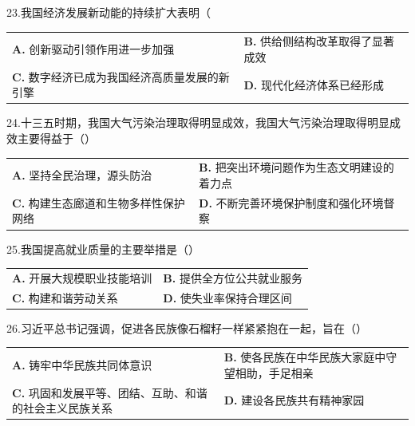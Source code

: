 \documentclass[UTF8,11pt]{ctexart}
\begin{document}
23.我国经济发展新动能的持续扩大表明（


\begin{center}\begin{tabular}{>{\raggedright\arraybackslash}p{\dimexpr(\linewidth-4\tabcolsep)/2\relax}>{\raggedright\arraybackslash}p{\dimexpr(\linewidth-4\tabcolsep)/2\relax}}
\textbf{A.} 创新驱动引领作用进一步加强 & \textbf{B.} 供给侧结构改革取得了显著成效\\[.35em]
\textbf{C.} 数字经济已成为我国经济高质量发展的新引擎 & \textbf{D.} 现代化经济体系已经形成\\[.35em]\end{tabular}\end{center}

24.十三五时期，我国大气污染治理取得明显成效，我国大气污染治理取得明显成效主要得益于（）


\begin{center}\begin{tabular}{>{\raggedright\arraybackslash}p{\dimexpr(\linewidth-4\tabcolsep)/2\relax}>{\raggedright\arraybackslash}p{\dimexpr(\linewidth-4\tabcolsep)/2\relax}}
\textbf{A.} 坚持全民治理，源头防治 & \textbf{B.} 把突出环境问题作为生态文明建设的着力点\\[.35em]
\textbf{C.} 构建生态廊道和生物多样性保护网络 & \textbf{D.} 不断完善环境保护制度和强化环境督察\\[.35em]\end{tabular}\end{center}

25.我国提高就业质量的主要举措是（）


\begin{center}\begin{tabular}{>{\raggedright\arraybackslash}p{\dimexpr(\linewidth-4\tabcolsep)/2\relax}>{\raggedright\arraybackslash}p{\dimexpr(\linewidth-4\tabcolsep)/2\relax}}
\textbf{A.} 开展大规模职业技能培训 & \textbf{B.} 提供全方位公共就业服务\\[.35em]
\textbf{C.} 构建和谐劳动关系 & \textbf{D.} 使失业率保持合理区间\\[.35em]\end{tabular}\end{center}

26.习近平总书记强调，促进各民族像石榴籽一样紧紧抱在一起，旨在（）


\begin{center}\begin{tabular}{>{\raggedright\arraybackslash}p{\dimexpr(\linewidth-4\tabcolsep)/2\relax}>{\raggedright\arraybackslash}p{\dimexpr(\linewidth-4\tabcolsep)/2\relax}}
\textbf{A.} 铸牢中华民族共同体意识 & \textbf{B.} 使各民族在中华民族大家庭中守望相助，手足相亲\\[.35em]
\textbf{C.} 巩固和发展平等、团结、互助、和谐的社会主义民族关系 & \textbf{D.} 建设各民族共有精神家园\\[.35em]\end{tabular}\end{center}
\end{document}
